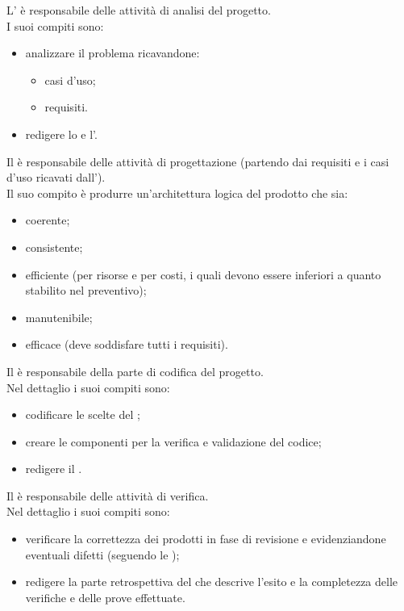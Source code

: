 L'\analProg{} è responsabile delle attività di analisi del progetto.\\I suoi compiti sono:
\begin{itemize}
\item analizzare il problema ricavandone:
\begin{itemize}
\item casi d'uso;
\item requisiti.
\end{itemize}
\item redigere lo \SdF{} e l'\AdR{}.
\end{itemize}  

Il \progetProg{} è responsabile delle attività di progettazione (partendo dai requisiti e i casi d'uso ricavati dall'\analProg{}).\\Il suo compito è produrre un'architettura logica del prodotto che sia:
\begin{itemize}
\item coerente;
\item consistente;
\item efficiente (per risorse e per costi, i quali devono essere inferiori a quanto stabilito nel preventivo);
\item manutenibile;
\item efficace (deve soddisfare tutti i requisiti).
\end{itemize}

Il \programProg{} è responsabile della parte di codifica del progetto.\\Nel dettaglio i suoi compiti sono:
\begin{itemize}
\item codificare le scelte del \progetProg{};
\item creare le componenti per la verifica e validazione del codice;
\item redigere il \MU{}.
\end{itemize}

Il \verifProg{} è responsabile delle attività di verifica.\\Nel dettaglio i suoi compiti sono:
\begin{itemize}
\item verificare la correttezza dei prodotti in fase di revisione e evidenziandone eventuali difetti (seguendo le \NdP{}); 
\item redigere la parte retrospettiva del \PdQ{} che descrive l'esito e la completezza delle verifiche e delle prove effettuate.
\end{itemize}